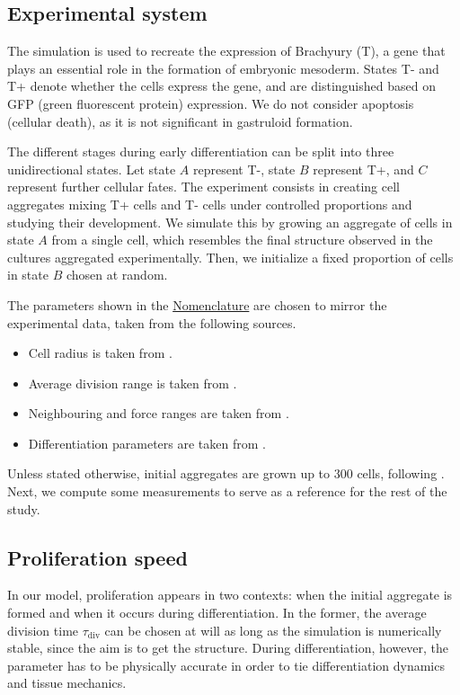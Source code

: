 \subsection{Experimental system}

The simulation is used to recreate the expression of Brachyury (T), a gene that plays an essential role in the formation of embryonic mesoderm. States T- and T+ denote whether the cells express the gene, and are distinguished based on GFP (green fluorescent protein) expression. We do not consider apoptosis (cellular death), as it is not significant in gastruloid formation.

The different stages during early differentiation can be split into three unidirectional states. Let state $A$ represent T-, state $B$ represent T+, and $C$ represent further cellular fates. The experiment consists in creating cell aggregates mixing T+ cells and T- cells under controlled proportions and studying their development. We simulate this by growing an aggregate of cells in state $A$ from a single cell, which resembles the final structure observed in the cultures aggregated experimentally. Then, we initialize a fixed proportion of cells in state $B$ chosen at random. 

The parameters shown in the \hyperref[ch:nomenclature]{Nomenclature} are chosen to mirror the experimental data, taken from the following sources.
\begin{itemize}
    \item Cell radius is taken from \cite{Pillarisetti_2009}.
    \item Average division range is taken from \cite{Roccio_2013}.
    \item Neighbouring and force ranges are taken from \cite{Saiz_2020}.
    \item Differentiation parameters are taken from \cite{Oriola_2025}.
\end{itemize}

Unless stated otherwise, initial aggregates are grown up to $300$ cells, following \cite{Brink_2014}. Next, we compute some measurements to serve as a reference for the rest of the study.


\subsection{Proliferation speed}

In our model, proliferation appears in two contexts: when the initial aggregate is formed and when it occurs during differentiation. In the former, the average division time $\tau_\text{div}$ can be chosen at will as long as the simulation is numerically stable, since the aim is to get the structure. During differentiation, however, the parameter has to be physically accurate in order to tie differentiation dynamics and tissue mechanics. 

